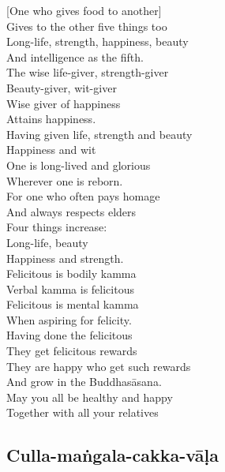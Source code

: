 \begin{english}
  [One who gives food to another]\\
  Gives to the other five things too\\
  Long-life, strength, happiness, beauty\\
  And intelligence as the fifth.\\
  The wise life-giver, strength-giver\\
  Beauty-giver, wit-giver\\
  Wise giver of happiness\\
  Attains happiness.\\
  Having given life, strength and beauty\\
  Happiness and wit\\
  One is long-lived and glorious\\
  Wherever one is reborn.\\
  For one who often pays homage\\
  And always respects elders\\
  Four things increase:\\
  Long-life, beauty\\
  Happiness and strength.\\
  Felicitous is bodily kamma\\
  Verbal kamma is felicitous\\
  Felicitous is mental kamma\\
  When aspiring for felicity.\\
  Having done the felicitous\\
  They get felicitous rewards\\
  They are happy who get such rewards\\
  And grow in the Buddhasāsana.\\
  May you all be healthy and happy\\
  Together with all your relatives
\end{english}

\suttaRef{[AN 5.37 / Dhp 109 / AN 3.155]}

\subsection{Culla-maṅgala-cakka-vāḷa}
\label{culla-mangala-cakka-vala}

